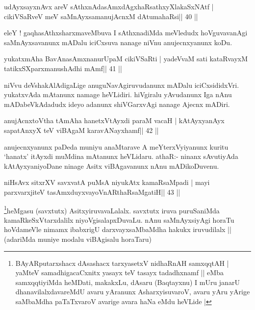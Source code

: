 \begin{shl}
udAyxsayxnAvx areV sAthxnAdasAmxdAgxhaRsathxyXlakaSxNAtf |
cikiVSaRveV meV saMnAyxsamanujAcnxM dAtumahaRsi\hfill || 40 ||
\end{shl}

\begin{artha}
eleY ! gaqhasAthxsharxmaveMbuva I sAthxnadiMda meVledudx hoVguvavanAgi saMnAyxsavanunx mADalu iciCxsuva nanage niVnu anujecnxyanunx koDu.
\end{artha}

\begin{shl}
yukatxmAha BavAnasAmxnanurUpaM cikiVSaRti |
yadeVvaM sati kataRvayxM tatikxSXparxmanushAdhi mAmf\hfill || 41 ||
\end{shl}

\begin{artha}
niVvu deVshakAlAdigaLige anuguNavAgiruvudanunx mADalu iciCxsididxVri. yukatxvAda mAtanunx namage heVLidiri. hiVgiralu yAvudanunx Iga nAnu mADabeVkAdadudx ideyo adanunx shiVGarxvAgi nanage Ajecnx mADiri.
\end{artha}


\begin{shl}
anujAcnxtoV\s tha tAmAha hanetxVtAyxdi paraM vacaH |
kAtAyxyanAyx sapatAnxyX teV viBAgaM karavANayxhamf\hfill || 42 ||
\end{shl}

\begin{artha}
anujecnxyanunx paDeda muniyu anaMtarave A meYterxVyiyanunx kuritu
`hanatx' itAyxdi muMdina mAtanunx heVLidaru. athaR:- ninanx sAvutiyAda
kAtAyxyaniyoDane ninage Asitx viBAgavanunx nAnu mADikoDuvenu.
\end{artha}


\begin{shl}
niHsAvx sitxrXV savxvatA puMsA niyukAtx kamaRsaMpadi |
mayi parxvarxjiteV tasAmxduyxvayoVnARthaRsaMgatiH\hfill || 43 ||
\end{shl}

\begin{artha}
\footnote[1]{BAyARputarxshacx dAsashacx tarxyasetxV nidhaRnAH
  samxqqtAH | yaMteV samadhigacaCxnitx yasayx teV tasayx tadadhxnamf || eMba
  samxqqtiyiMda heMDati, makakxLu, dAsaru (Baqtayxnu) I mUru janarU
  dhanavilalxdavareMdU avaru yAranunx AsharxyisuvaroV, avaru yAru
  yArige saMbaMdha paTaTxvaroV avarige avara haNa eMdu heVLide |}heMgasu 
  (savxtutx) AsitxyiruvavaLalalx. savxtutx iruva
puruSaniMda kamaRkeSxVtarxdalilx niyoVgisalapxDuvaLu. nAnu
saMnAyxsiyAgi horaTu hoVdameVle nimamx ibabxrigU darxvayxsaMbaMdha
hakukx iruvudilalx || (adariMda muniye modalu viBAgisalu horaTaru)
\end{artha}

